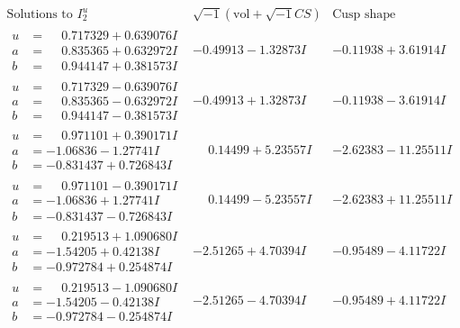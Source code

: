 \documentclass[1p]{elsarticle_modified}
\theoremstyle{definition}
\newcommand{\I}{\sqrt{-1}}
\begin{document}
$$\begin{array}{c|c|c}  
\text{Solutions to }I^u_{2}& \I (\text{vol} + \sqrt{-1}CS) & \text{Cusp shape}\\
 \hline 
\begin{aligned}
u &= \phantom{-}0.717329 + 0.639076 I \\
a &= \phantom{-}0.835365 + 0.632972 I \\
b &= \phantom{-}0.944147 + 0.381573 I\end{aligned}
 & -0.49913 - 1.32873 I & -0.11938 + 3.61914 I \\ \hline\begin{aligned}
u &= \phantom{-}0.717329 - 0.639076 I \\
a &= \phantom{-}0.835365 - 0.632972 I \\
b &= \phantom{-}0.944147 - 0.381573 I\end{aligned}
 & -0.49913 + 1.32873 I & -0.11938 - 3.61914 I \\ \hline\begin{aligned}
u &= \phantom{-}0.971101 + 0.390171 I \\
a &= -1.06836 - 1.27741 I \\
b &= -0.831437 + 0.726843 I\end{aligned}
 & \phantom{-}0.14499 + 5.23557 I & -2.62383 - 11.25511 I \\ \hline\begin{aligned}
u &= \phantom{-}0.971101 - 0.390171 I \\
a &= -1.06836 + 1.27741 I \\
b &= -0.831437 - 0.726843 I\end{aligned}
 & \phantom{-}0.14499 - 5.23557 I & -2.62383 + 11.25511 I \\ \hline\begin{aligned}
u &= \phantom{-}0.219513 + 1.090680 I \\
a &= -1.54205 + 0.42138 I \\
b &= -0.972784 + 0.254874 I\end{aligned}
 & -2.51265 + 4.70394 I & -0.95489 - 4.11722 I \\ \hline\begin{aligned}
u &= \phantom{-}0.219513 - 1.090680 I \\
a &= -1.54205 - 0.42138 I \\
b &= -0.972784 - 0.254874 I\end{aligned}
 & -2.51265 - 4.70394 I & -0.95489 + 4.11722 I \\ \hline\begin{aligned}

\end{aligned}
\end{array}$$
\end{document}
